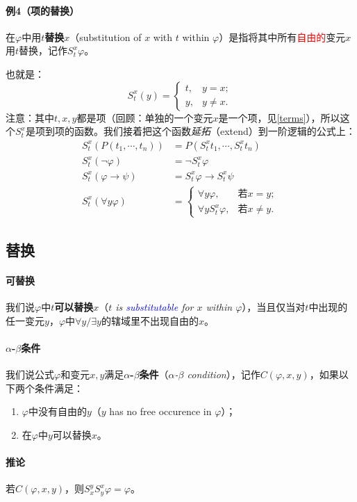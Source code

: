 \documentclass[b5paper,oneside]{ctexbook}
\newcommand{\Blue}[1]{\textcolor[named]{blue}{#1}}
\newcommand{\Red}[1]{\textcolor[named]{red}{#1}}
\begin{document}
\paragraph{例4（项的替换）}在$\varphi$中用$t$\textbf{替换}$x$（substitution of $x$ with $t$ within $\varphi$）是指将其中所有\Red{自由的}变元$x$用$t$替换，记作$S_t^x\varphi$。

也就是：\[S_t^x(y)=\begin{cases}t,&y=x;\\y,&y\neq x.\end{cases}\]
注意：其中$t,x,y$都是项（回顾：单独的一个变元$x$是一个项，见\ref{terms}），所以这个$S_t^x$是项到项的函数。我们接着把这个函数\textit{延拓}（extend）到一阶逻辑的公式上：
\begin{align*}
S_t^x(P(t_1,\cdots ,t_n))&=P(S_t^xt_1,\cdots ,S_t^xt_n)
\\S_t^x(\neg\varphi)&=\neg S_t^x\varphi
\\S_t^x(\varphi\to\psi)&=S_t^x\varphi\to S_t^x\psi
\\S_t^x(\forall y\varphi)&=\begin{cases}
\forall y\varphi,&\text{若}x=y;
\\\forall y S_t^x\varphi,&\text{若}x\neq y.
\end{cases}
\end{align*}
\subsection{替换}
\paragraph{可替换}我们说$\varphi$中$t$\textbf{可以替换}$x$（\textit{$t$ is \Blue{substitutable} for $x$ within $\varphi$}），当且仅当对$t$中出现的任一变元$y$，$\varphi$中$\forall y/\exists y$的辖域里不出现自由的$x$。
\paragraph{$\alpha$-$\beta$条件}我们说公式$\varphi$和变元$x,y$满足\textbf{$\alpha$-$\beta$条件}（\textit{$\alpha$-$\beta$ condition}），记作$C(\varphi,x,y)$，如果以下两个条件满足：\label{abcond}
\begin{enumerate}
\item $\varphi$中没有自由的$y$（$y$ has no free occurence in $\varphi$）；
\item 在$\varphi$中$y$可以替换$x$。
\end{enumerate}
\paragraph{推论}若$C(\varphi,x,y)$，则$S_x^yS_y^x\varphi=\varphi$。
\end{document}
